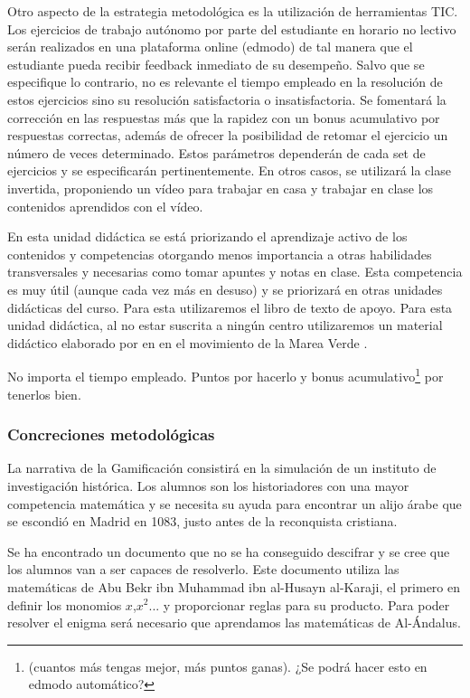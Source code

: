 Otro aspecto de la  estrategia metodológica es la utilización de herramientas \gls{TIC}.
%
Los ejercicios de trabajo autónomo por parte del estudiante en horario no lectivo serán realizados en una plataforma online (edmodo) de tal manera que el estudiante pueda recibir feedback inmediato de su desempeño.
%
Salvo que se especifique lo contrario, no es relevante el tiempo empleado en la resolución de estos ejercicios sino su resolución satisfactoria o insatisfactoria.
%
Se fomentará la corrección en las respuestas más que la rapidez con un bonus acumulativo por respuestas correctas, además de ofrecer la posibilidad de retomar el ejercicio un número de veces determinado.
%
Estos parámetros dependerán de cada set de ejercicios y se especificarán pertinentemente.
%
En otros casos, se utilizará la clase invertida, proponiendo un vídeo para trabajar en casa y trabajar en clase los contenidos aprendidos con el vídeo.


En esta unidad didáctica se está priorizando el aprendizaje activo de los contenidos y competencias otorgando menos importancia a otras habilidades transversales y necesarias como tomar apuntes y notas en clase. 
%
Esta competencia es muy útil (aunque cada vez más en desuso) y se priorizará en otras unidades didácticas del curso. 
%
Para esta utilizaremos el libro de texto de apoyo. Para esta unidad didáctica, al no estar suscrita a ningún centro utilizaremos un material didáctico elaborado por \citeauthor{MareaVerde} en \citeyear{MareaVerde} en el movimiento de la Marea Verde \cite{MareaVerde}.

No importa el tiempo empleado. 
%
Puntos por hacerlo y bonus acumulativo\footnote{(cuantos más tengas mejor, más puntos ganas). ¿Se podrá hacer esto en edmodo automático?} por tenerlos bien.


\subsubsection{Concreciones metodológicas}

La narrativa de la Gamificación consistirá en la simulación de un instituto de investigación histórica.
%
Los alumnos son los historiadores con una mayor competencia matemática y se necesita su ayuda para encontrar un alijo árabe que se escondió en Madrid en 1083, justo antes de la reconquista cristiana.

Se ha encontrado un documento que no se ha conseguido descifrar y se cree que los alumnos van a ser capaces de resolverlo.
%
%
Este documento utiliza las matemáticas de Abu Bekr ibn Muhammad ibn al-Husayn al-Karaji, el primero en definir los monomios $x$,$x^2$... y proporcionar reglas para su producto.\cite{MatArabe}
%
Para poder resolver el enigma será necesario que aprendamos las matemáticas de Al-Ándalus.


